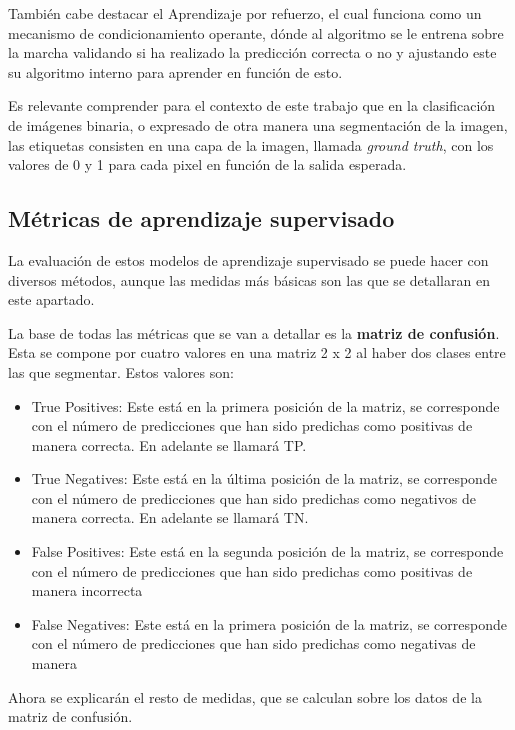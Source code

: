 También cabe destacar el Aprendizaje por refuerzo, el cual funciona como un mecanismo de condicionamiento operante, dónde al algoritmo se le entrena sobre la marcha validando si ha realizado la predicción correcta o no y ajustando este su algoritmo interno para aprender en función de esto.

Es relevante comprender para el contexto de este trabajo que en la clasificación de imágenes binaria, o expresado de otra manera una segmentación de la imagen, las etiquetas consisten en una capa de la imagen, llamada \textit{ground truth}, con los valores de 0 y 1 para cada pixel en función de la salida esperada.

\subsection{Métricas de aprendizaje supervisado}
La evaluación de estos modelos de aprendizaje supervisado se puede hacer con diversos métodos, aunque las medidas más básicas son las que se detallaran en este apartado.

La base de todas las métricas \cite{themachinelearnersMtricasClasificacin} que se van a detallar es la \textbf{matriz de confusión}. Esta se compone por cuatro valores en una matriz 2 x 2 al haber dos clases entre las que segmentar.
Estos valores son:
\begin{itemize}
	\item True Positives: Este está en la primera posición de la matriz, se corresponde con el número de predicciones que han sido predichas como positivas de manera correcta. En adelante se llamará TP. 
	
	\item True Negatives: Este está en la última posición de la matriz, se corresponde con el número de predicciones que han sido predichas como negativos de manera correcta. En adelante se llamará TN. 
	
	\item False Positives: Este está en la segunda posición de la matriz, se corresponde con el número de predicciones que han sido predichas como positivas de manera incorrecta
	
	\item False Negatives: Este está en la primera posición de la matriz, se corresponde con el número de predicciones que han sido predichas como negativas de manera 
	
\end{itemize}

Ahora se explicarán el resto de medidas, que se calculan sobre los datos de la matriz de confusión.

